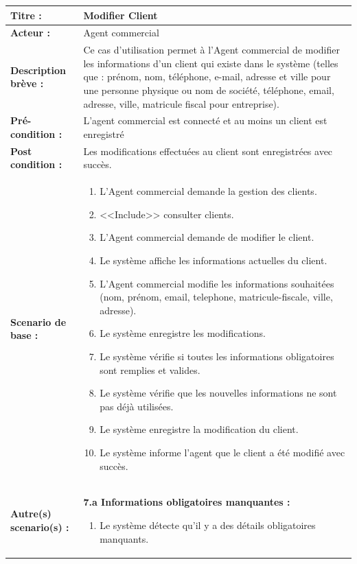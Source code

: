 \begin{table}[H]
\footnotesize
\renewcommand{\arraystretch}{0.88}
\begin{tabularx}{\textwidth}{|p{3.4cm}|X|}
\hline
\textbf{Titre :} & Modifier Client \\
\hline
\textbf{Acteur :} & Agent commercial \\
\hline
\textbf{Description brève :} & Ce cas d'utilisation permet à l'Agent commercial de modifier les informations d'un client qui existe dans le système (telles que : prénom, nom, téléphone, e-mail, adresse et ville pour une personne physique ou nom de société, téléphone, email, adresse, ville, matricule fiscal pour entreprise). \\
\hline
\textbf{Pré-condition :} & L'agent commercial est connecté et au moins un client est enregistré \\
\hline
\textbf{Post condition :} & Les modifications effectuées au client sont enregistrées avec succès. \\
\hline
\textbf{Scenario de base :} &
\begin{enumerate}[leftmargin=1.5em, topsep=1pt, itemsep=0pt]
  \item L'Agent commercial demande la gestion des clients.
  \item <<Include>> consulter clients.
  \item L'Agent commercial demande de modifier le client.
  \item Le système affiche les informations actuelles du client.
  \item L'Agent commercial modifie les informations souhaitées (nom, prénom, email, telephone, matricule-fiscale, ville, adresse).
  \item Le système enregistre les modifications.
  \item Le système vérifie si toutes les informations obligatoires sont remplies et valides.
  \item Le système vérifie que les nouvelles informations ne sont pas déjà utilisées.
  \item Le système enregistre la modification du client.
  \item Le système informe l'agent que le client a été modifié avec succès.
\end{enumerate} \\
\hline
\textbf{Autre(s) scenario(s) :} &
\textbf{7.a Informations obligatoires manquantes :}
\begin{enumerate}[leftmargin=1.5em, topsep=1pt, itemsep=0pt]
  \item Le système détecte qu'il y a des détails obligatoires manquants.

\end{enumerate}
\end{tabularx}
\end{table}
